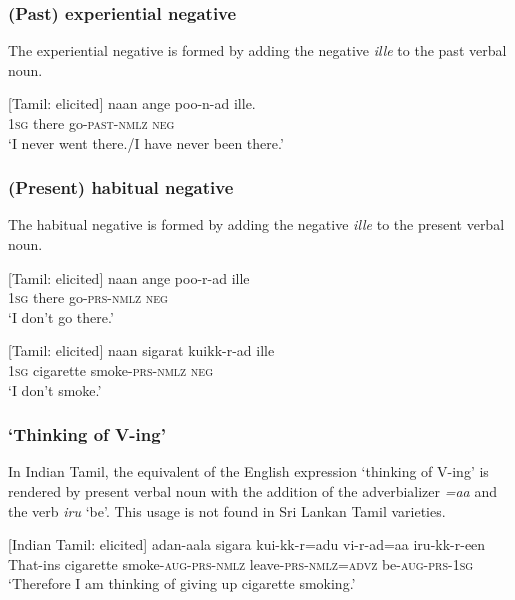 \subsubsection{(Past) experiential negative}%
The experiential negative is formed by adding the negative \textit{ille} to the past verbal noun.

\ea\label{smith:ex:9}
{}[Tamil: elicited]
\gll naan ange poo-n-ad ille. \\
1\textsc{sg} there go-\textsc{past}-\textsc{nmlz} \textsc{neg}\\
 `I never went there./I have never been there.'
\z

\subsubsection{(Present) habitual negative}%
The habitual negative is formed by adding the negative \textit{ille} to the present verbal noun.

\ea\label{smith:ex:10}
{}[Tamil: elicited]
\gll naan ange poo-r-ad ille \\
1\textsc{sg} there go-\textsc{prs}-\textsc{nmlz} \textsc{neg} \\
 `I don't go there.'
\z

\ea\label{smith:ex:11}
{}[Tamil: elicited]
\gll naan sigarat ku{\textrtaild}ikk-r-ad ille \\
1\textsc{sg} cigarette smoke-\textsc{prs}-\textsc{nmlz} \textsc{neg} \\
 `I don't smoke.'
\z

\subsubsection{`Thinking of V-ing'}%

In Indian Tamil, the equivalent of the English expression `thinking of V-ing' is rendered by present verbal noun with the addition of the adverbializer \textit{=aa} and the verb \textit{iru }`be'. This usage is not found in Sri Lankan Tamil varieties.

\ea\label{smith:ex:12}
{}[Indian Tamil: elicited]
\gll adan-aala sigara{\textrtailt} ku{\textrtaild}i-kk-r=adu vi{\textrtaild}-r-ad=aa iru-kk-r-een\\
That-ins cigarette smoke-\textsc{aug}-\textsc{prs}-\textsc{nmlz} leave-\textsc{prs}-\textsc{nmlz}=\textsc{advz} be-\textsc{aug}-\textsc{prs}-1\textsc{sg}\\
`Therefore I am thinking of giving up cigarette smoking.'
\z



